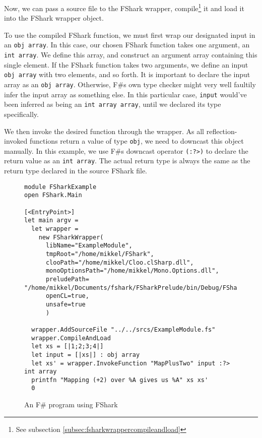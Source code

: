 Now, we can pass a source file to the FShark wrapper, compile\footnote{See
  subsection \ref{subsec:fsharkwrappercompileandload}} it and load it into the FShark wrapper object.

To use the compiled FShark function, we must first wrap our designated input in
an \texttt{obj array}. In this case, our chosen FShark function takes one
argument, an \texttt{int array}. We define this array, and construct an argument
array containing this single element. If the FShark function takes two
arguments, we define an input \texttt{obj array} with two elements, and so
forth.
It is important to declare the input array as an \texttt{obj array}. Otherwise,
F\#s own type checker might very well faultily infer the input array as
something else. In this particular case, \texttt{input} would've been inferred
as being an \texttt{int array array}, until we declared its type specifically.

We then invoke the desired function through the wrapper. As all
reflection-invoked functions return a value of type \texttt{obj}, we need to
downcast this object manually.
In this example, we use F\#s downcast operator \texttt{(:?>)} to declare the
return value as an \texttt{int array}. The actual return type is always the same as the
return type declared in the source FShark file.

\begin{figure}
  \centering
    \begin{verbatim}
module FSharkExample
open FShark.Main

[<EntryPoint>]
let main argv =
  let wrapper = 
    new FSharkWrapper(
      libName="ExampleModule",
      tmpRoot="/home/mikkel/FShark",
      clooPath="/home/mikkel/Cloo.clSharp.dll",
      monoOptionsPath="/home/mikkel/Mono.Options.dll",
      preludePath= "/home/mikkel/Documents/fshark/FSharkPrelude/bin/Debug/FSharkPrelude.dll",
      openCL=true,
      unsafe=true
      )

  wrapper.AddSourceFile "../../srcs/ExampleModule.fs"
  wrapper.CompileAndLoad
  let xs = [|1;2;3;4|]
  let input = [|xs|] : obj array
  let xs' = wrapper.InvokeFunction "MapPlusTwo" input :?> int array
  printfn "Mapping (+2) over %A gives us %A" xs xs'
  0
    \end{verbatim}
  \caption{An F\# program using FShark}
  \label{fig:fsharkusageexample}
\end{figure}

